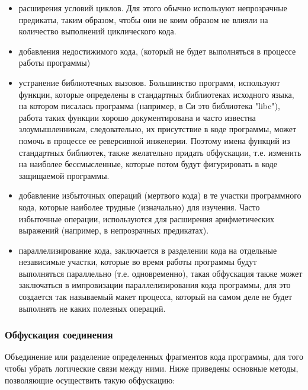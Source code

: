 \begin{itemize}
\item расширения условий циклов. Для этого обычно используют непрозрачные предикаты, таким образом, чтобы они не коим образом не влияли на количество выполнений циклического кода.
\item добавления недостижимого кода, (который не будет выполняться в процессе работы программы)
\item устранение библиотечных вызовов. Большинство программ, используют функции, которые определены в стандартных библиотеках исходного языка, на котором писалась программа (например, в Си это библиотека "libc"), работа таких функции хорошо документирована и часто известна злоумышленникам, следовательно, их присутствие в коде программы, может помочь в процессе ее реверсивной инженерии. Поэтому имена функций из стандартных библиотек, также желательно придать обфускации, т.е. изменить на наиболее бессмысленные, которые потом будут фигурировать в коде защищаемой программы.
\item добавление избыточных операций (мертвого кода) в те участки программного кода, которые наиболее трудные (изначально) для изучения. Часто избыточные операции, используются для расширения арифметических выражений (например, в непрозрачных предикатах).
\item параллелизирование кода, заключается в разделении кода на отдельные независимые участки, которые во время работы программы будут выполняться параллельно (т.е. одновременно), такая обфускация также может заключаться в импровизации параллелизирования кода программы, для это создается так называемый макет процесса, который на самом деле не будет выполнять не каких полезных операций. 
\end{itemize}

\subsubsection{Обфускация соединения}

Объединение или разделение определенных фрагментов кода программы, для того чтобы убрать логические связи между ними. Ниже приведены основные методы, позволяющие осуществить такую обфускацию:

